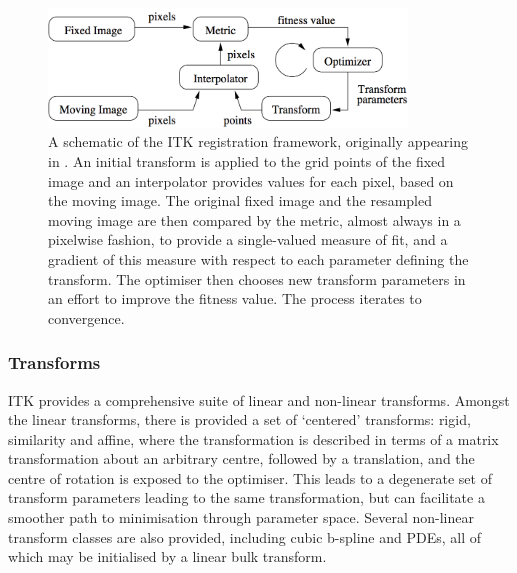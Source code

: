     \begin{figure}[htbp]
      \centering
      \includegraphics[width=0.85\textwidth]{Ch2/Figs/framework}
      \caption{A schematic of the ITK registration framework, originally appearing in \cite{ITKGuide}. An initial transform is applied to the grid points of the fixed image and an interpolator provides values for each pixel, based on the moving image. The original fixed image and the resampled moving image are then compared by the metric, almost always in a pixelwise fashion, to provide a single-valued measure of fit, and a gradient of this measure with respect to each parameter defining the transform. The optimiser then chooses new transform parameters in an effort to improve the fitness value. The process iterates to convergence.}
      \label{fig:framework}
    \end{figure}
    
    \subsubsection{Transforms} %
    \label{ssub:transforms}
      ITK provides a comprehensive suite of linear and non-linear transforms. Amongst the linear transforms, there is provided a set of `centered' transforms: rigid, similarity and affine, where the transformation is described in terms of a matrix transformation about an arbitrary centre, followed by a translation, and the centre of rotation is exposed to the optimiser. This leads to a degenerate set of transform parameters leading to the same transformation, but can facilitate a smoother path to minimisation through parameter space. Several non-linear transform classes are also provided, including cubic b-spline and PDEs, all of which may be initialised by a linear bulk transform.
    
